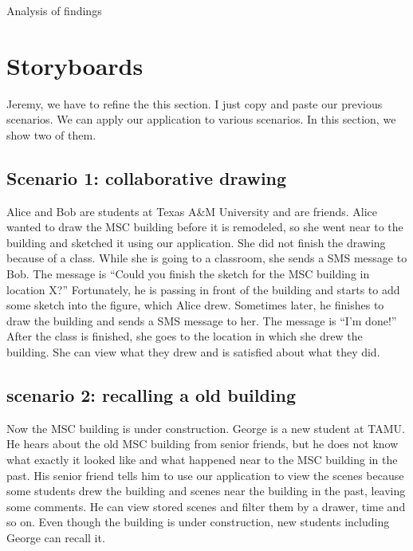 \documentclass{www2010-submission}
\begin{document}
Analysis of findings

\section{Storyboards}
Jeremy, we have to refine the this section. I just copy and paste our previous scenarios.
We can apply our application to various scenarios. In this section, we show two
of them.

\subsection{Scenario 1: collaborative drawing}

Alice and Bob are students at Texas A\&M University and are friends. Alice
wanted to draw the MSC building before it is remodeled, so she went near to the
building and sketched it using our application. She did not finish the drawing
because of a class. While she is going to a classroom, she sends a SMS message
to Bob. The message is ``Could you finish the sketch for the MSC building in
location X?'' Fortunately, he is passing in front of the building and starts to
add some sketch into the figure, which Alice drew. Sometimes later, he finishes
to draw the building and sends a SMS message to her. The message is ``I'm
done!'' After the class is finished, she goes to the location in which she drew
the building. She can view what they drew and is satisfied about what they did.

\subsection{scenario 2: recalling a old building}

Now the MSC building is under construction. George is a new student at TAMU. He
hears about the old MSC building from senior friends, but he does not know what
exactly it looked like and what happened near to the MSC building in the past.
His senior friend tells him to use our application to view the scenes because
some students drew the building and scenes near the building in the past,
leaving some comments. He can view stored scenes and filter them by a drawer,
time and so on. Even though the building is under construction, new students
including George can recall it.




 
\end{document}
